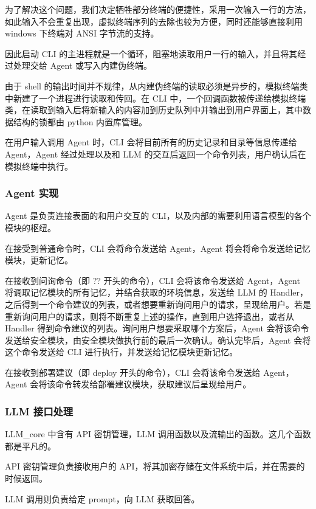 \documentclass{article}
\theoremstyle{plain}
\theoremstyle{definition}
\theoremstyle{remark}
\begin{document}
为了解决这个问题，我们决定牺牲部分终端的便捷性，采用一次输入一行的方法，如此输入不会重复出现，虚拟终端序列的去除也较为方便，同时还能够直接利用 windows 下终端对 ANSI 字节流的支持。

因此启动 CLI 的主进程就是一个循环，阻塞地读取用户一行的输入，并且将其经过处理交给 Agent 或写入内建伪终端。

由于 shell 的输出时间并不规律，从内建伪终端的读取必须是异步的，模拟终端类中新建了一个进程进行读取和传回。在 CLI 中，一个回调函数被传递给模拟终端类，在读取到输入后将新输入的内容加到历史队列中并输出到用户界面上，其中数据结构的锁都由 python 内置库管理。

在用户输入调用 Agent 时，CLI 会将目前所有的历史记录和目录等信息传递给 Agent，Agent 经过处理以及和 LLM 的交互后返回一个命令列表，用户确认后在模拟终端中执行。

\subsubsection{Agent 实现}

Agent 是负责连接表面的和用户交互的 CLI，以及内部的需要利用语言模型的各个模块的枢纽。

在接受到普通命令时，CLI 会将命令发送给 Agent，Agent 将会将命令发送给记忆模块，更新记忆。

在接收到问询命令（即 ?? 开头的命令），CLI 会将该命令发送给 Agent，Agent 将调取记忆模块的所有记忆，并结合获取的环境信息，发送给 LLM 的 Handler，之后得到一个命令建议的列表，或者想要重新询问用户的请求，呈现给用户。若是重新询问用户的请求，则将不断重复上述的操作，直到用户选择退出，或者从 Handler 得到命令建议的列表。询问用户想要采取哪个方案后，Agent 会将该命令发送给安全模块，由安全模块做执行前的最后一次确认。确认完毕后，Agent 会将这个命令发送给 CLI 进行执行，并发送给记忆模块更新记忆。

在接收到部署建议（即 deploy 开头的命令），CLI 会将该命令发送给 Agent，Agent 会将该命令转发给部署建议模块，获取建议后呈现给用户。

\subsubsection{LLM 接口处理}

LLM\_core 中含有 API 密钥管理，LLM 调用函数以及流输出的函数。这几个函数都是平凡的。

API 密钥管理负责接收用户的 API，将其加密存储在文件系统中后，并在需要的时候返回。

LLM 调用则负责给定 prompt，向 LLM 获取回答。
\end{document}
